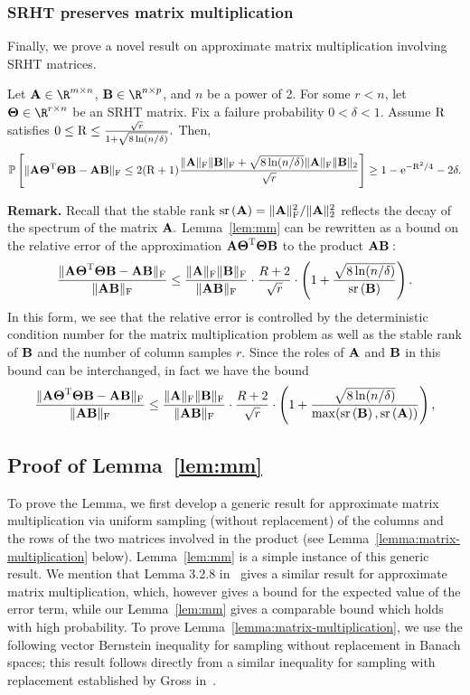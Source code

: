 \subsubsection{SRHT preserves matrix multiplication}
Finally, we prove a novel result on approximate matrix multiplication involving SRHT matrices.
\begin{lemma}\label{lem:mm}
Let $\matA \in \R^{m \times n}$, $\matB \in \R^{n \times p}$, and $n$ be a power of 2.
For some $r < n$, let $\matTh \in \R^{r \times n}$ be an SRHT matrix. Fix a failure probability $0 < \delta < 1.$
Assume $\mathrm{R}$ satisfies
$
 0 \leq \mathrm{R} \leq {\sqrt{r}\over 1+\sqrt{8\ln(n/\delta)}}.
$
Then,
\[
 \mbox{}{\mathbb{P}}\left[ \mbox{}\|{\bm{\mathrm{A}}} {\bm{\mathrm{\Theta}}}^{\textsc{T}} {\bm{\mathrm{\Theta}}} {\bm{\mathrm{B}}} - {\bm{\mathrm{A}}} {\bm{\mathrm{B}}}\|_\mathrm{F}  \leq 2 (\mathrm{R} + 1)
 {\mbox{}\|{\bm{\mathrm{A}}}\|_\mathrm{F}\mbox{}\|{\bm{\mathrm{B}}}\|_\mathrm{F} + \sqrt{8 \ln(n/\delta)}\mbox{}\|{\bm{\mathrm{A}}}\|_\mathrm{F}\mbox{}\|{\bm{\mathrm{B}}}\|_2\over \sqrt{r}} \right] \geq 1 - {\mathrm e}^{-\mathrm{R}^2/4} - 2\delta.
\]
\end{lemma}

{\bf Remark.} Recall that the stable rank $\operatorname{sr}\left({\bm{\mathrm{A}}}\right) = \mbox{}\|{\bm{\mathrm{A}}}\|_\mathrm{F}^2/\mbox{}\|{\bm{\mathrm{A}}}\|_2^2$ reflects the decay of the spectrum of the matrix ${\bm{\mathrm{A}}}.$ Lemma~\ref{lem:mm} can be rewritten as a bound on the relative error of the approximation ${\bm{\mathrm{A}}} {\bm{\mathrm{\Theta}}}^{\textsc{T}} {\bm{\mathrm{\Theta}}} {\bm{\mathrm{B}}}$ to the product ${\bm{\mathrm{A}}} {\bm{\mathrm{B}}}:$
\[
{\mbox{}\|{\bm{\mathrm{A}}} {\bm{\mathrm{\Theta}}}^{\textsc{T}} {\bm{\mathrm{\Theta}}} {\bm{\mathrm{B}}} - {\bm{\mathrm{A}}} {\bm{\mathrm{B}}}\|_\mathrm{F}\over \mbox{}\|{\bm{\mathrm{A}}} {\bm{\mathrm{B}}}\|_\mathrm{F}} \leq {\mbox{}\|{\ensuremath{\bm{\mathrm{A}}}}\|_\mathrm{F} \mbox{}\|{\ensuremath{\bm{\mathrm{B}}}}\|_\mathrm{F} \over \mbox{}\|{\ensuremath{\bm{\mathrm{A}}}}{\ensuremath{\bm{\mathrm{B}}}}\|_\mathrm{F} } \cdot {R+2\over \sqrt{r}} \cdot \left(1 + {\sqrt{8 \ln(n/\delta)}\over \operatorname{sr}\left({\bm{\mathrm{B}}}\right)} \right).
\]
In this form, we see that the relative error is controlled by the deterministic condition number for the matrix multiplication problem as well as the stable rank of ${\bm{\mathrm{B}}}$ and the number of column samples $r.$ Since the roles of ${\bm{\mathrm{A}}}$ and ${\bm{\mathrm{B}}}$ in this bound can be interchanged, in fact we have the bound
\[
{\mbox{}\|{\bm{\mathrm{A}}} {\bm{\mathrm{\Theta}}}^{\textsc{T}} {\bm{\mathrm{\Theta}}} {\bm{\mathrm{B}}} - {\bm{\mathrm{A}}} {\bm{\mathrm{B}}}\|_\mathrm{F}\over \mbox{}\|{\bm{\mathrm{A}}} {\bm{\mathrm{B}}}\|_\mathrm{F}} \leq {\mbox{}\|{\ensuremath{\bm{\mathrm{A}}}}\|_\mathrm{F} \mbox{}\|{\ensuremath{\bm{\mathrm{B}}}}\|_\mathrm{F} \over \mbox{}\|{\ensuremath{\bm{\mathrm{A}}}}{\ensuremath{\bm{\mathrm{B}}}}\|_\mathrm{F} } \cdot {R+2\over \sqrt{r}} \cdot \left(1 + {\sqrt{8 \ln(n/\delta)}\over \max(\operatorname{sr}\left({\bm{\mathrm{B}}}\right), \operatorname{sr}\left({\bm{\mathrm{A}}}\right))} \right),
\]

\subsection*{Proof of Lemma~\ref{lem:mm}}
To prove the Lemma, we first develop a generic result for approximate matrix multiplication via uniform sampling (without replacement)
of the columns and the rows of the two matrices involved in the product (see Lemma~\ref{lemma:matrix-multiplication} below).
Lemma~\ref{lem:mm} is a simple instance of this generic result.
We mention that Lemma 3.2.8 in~\cite{Dri02} gives a
similar result for approximate matrix multiplication, which, however gives a bound for the expected value of the error term, while our Lemma~\ref{lem:mm}
gives a comparable bound which holds with high probability. To prove Lemma~\ref{lemma:matrix-multiplication},
we use the following vector Bernstein inequality for sampling without replacement in Banach spaces; this result follows directly from a similar inequality for sampling with replacement established by Gross in~\cite{Gross11}.


